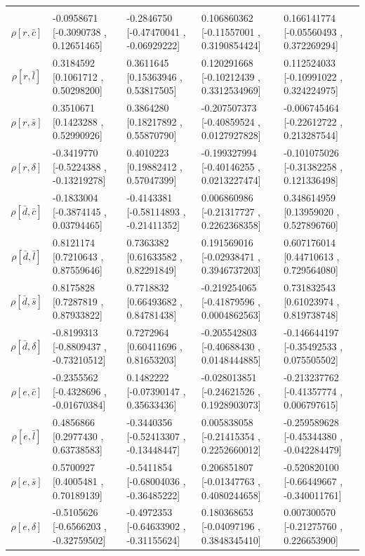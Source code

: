\begin{center}
\begin{tabular}{|c|p{3.7cm}|p{3.7cm}|p{3.7cm}|p{3.7cm}|}
&&&&\\
$\rho[r,\bar{c}]$&-0.0958671 [-0.3090738 , 0.12651465]&-0.2846750 [-0.47470041 , -0.06929222]&0.106860362 [-0.11557001 , 0.3190854424]&0.166141774 [-0.05560493 , 0.372269294]\\
$\rho[r,\bar{l}]$&0.3184592 [0.1061712 , 0.50298200]&0.3611645 [0.15363946 , 0.53817505]&0.120291668 [-0.10212439 , 0.3312534969]&0.112524033 [-0.10991022 , 0.324224975]\\
$\rho[r,\bar{s}]$&0.3510671 [0.1423288 , 0.52990926]&0.3864280 [0.18217892 , 0.55870790]&-0.207507373 [-0.40859524 , 0.0127927828]&-0.006745464 [-0.22612722 , 0.213287544]\\
$\rho[r,\delta]$&-0.3419770 [-0.5224388 , -0.13219278]&0.4010223 [0.19882412 , 0.57047399]&-0.199327994 [-0.40146255 , 0.0213227474]&-0.101075026 [-0.31382258 , 0.121336498]\\
$\rho[\bar{d},\bar{c}]$&-0.1833004 [-0.3874145 , 0.03794465]&-0.4143381 [-0.58114893 , -0.21411352]&0.006860986 [-0.21317727 , 0.2262368358]&0.348614959 [0.13959020 , 0.527896760]\\
$\rho[\bar{d},\bar{l}]$&0.8121174 [0.7210643 , 0.87559646]&0.7363382 [0.61633582 , 0.82291849]&0.191569016 [-0.02938471 , 0.3946737203]&0.607176014 [0.44710613 , 0.729564080]\\
$\rho[\bar{d},\bar{s}]$&0.8175828 [0.7287819 , 0.87933822]&0.7718832 [0.66493682 , 0.84781438]&-0.219254065 [-0.41879596 , 0.0004862563]&0.731832543 [0.61023974 , 0.819738748]\\
$\rho[\bar{d},\delta]$&-0.8199313 [-0.8809437 , -0.73210512]&0.7272964 [0.60411696 , 0.81653203]&-0.205542803 [-0.40688430 , 0.0148444885]&-0.146644197 [-0.35492533 , 0.075505502]\\
$\rho[e,\bar{c}]$&-0.2355562 [-0.4328696 , -0.01670384]&0.1482222 [-0.07390147 , 0.35633436]&-0.028013851 [-0.24621526 , 0.1928903073]&-0.213237762 [-0.41357774 , 0.006797615]\\
$\rho[e,\bar{l}]$&0.4856866 [0.2977430 , 0.63738583]&-0.3440356 [-0.52413307 , -0.13448447]&0.005838058 [-0.21415354 , 0.2252660012]&-0.259589628 [-0.45344380 , -0.042284479]\\
$\rho[e,\bar{s}]$&0.5700927 [0.4005481 , 0.70189139]&-0.5411854 [-0.68004036 , -0.36485222]&0.206851807 [-0.01347763 , 0.4080244658]&-0.520820100 [-0.66449667 , -0.340011761]\\
$\rho[e,\delta]$&-0.5105626 [-0.6566203 , -0.32759502]&-0.4972353 [-0.64633902 , -0.31155624]&0.180368653 [-0.04097196 , 0.3848345410]&0.007300570 [-0.21275760 , 0.226653900]\\

\end{tabular}
\end{center}
